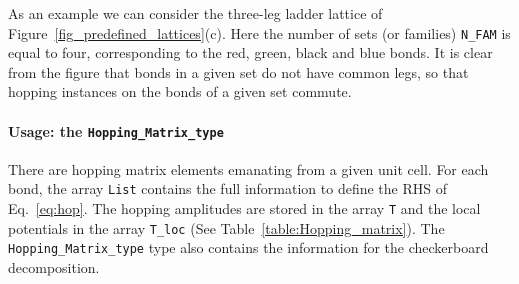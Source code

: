 As an  example we can consider the three-leg ladder lattice of Figure~\ref{fig_predefined_lattices}(c).   Here the number of sets (or families) \texttt{N\_FAM} is equal to four, corresponding to the red, green, black and blue  bonds. It is clear from the figure that bonds in a given set do not have common legs, so that hopping instances on the bonds of a given set commute.

\paragraph*{Usage: the \texttt{Hopping\_Matrix\_type} } %

There are     hopping   matrix  elements  emanating  from  a  given unit  cell. For  each bond,  the array 
\texttt{List}   contains the full  information to define the  RHS of Eq.~\eqref{eq:hop}.    The hopping amplitudes are  stored in the  array  \texttt{T}  and the local potentials in the  array \texttt{T\_loc}   (See  Table~\ref{table:Hopping_matrix}).    The  \texttt{Hopping\_Matrix\_type}   type    also contains the information for the  checkerboard   decomposition.


